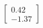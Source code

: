 \documentclass[preview]{standalone}
\begin{document}
\begin{align*}
\begin{bmatrix} 0.42 \\ -1.37 \end{bmatrix}
\end{align*}
\end{document}
